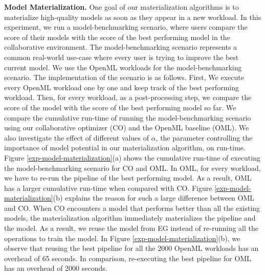 \textbf{Model Materialization. }
One goal of our materialization algorithms is to materialize high-quality models as soon as they appear in a new workload.
In this experiment, we run a model-benchmarking scenario, where users compare the score of their models with the score of the best performing model in the collaborative environment.
The model-benchmarking scenario represents a common real-world use-case where every user is trying to improve the best current model.
We use the OpenML workloads for the model-benchmarking scenario.
The implementation of the scenario is as follows.
First, We execute every OpenML workload one by one and keep track of the best performing workload.
Then, for every workload, as a post-processing step, we compare the score of the model with the score of the best performing model so far.
We compare the cumulative run-time of running the model-benchmarking scenario using our collaborative optimizer (CO) and the OpenML baseline (OML).
We also investigate the effect of different values of $\alpha$, the parameter controlling the importance of model potential in our materialization algorithm, on run-time.
Figure \ref{exp-model-materialization}(a) shows the cumulative run-time of executing the model-benchmarking scenario for CO and OML.
In OML, for every workload, we have to re-run the pipeline of the best performing model.
As a result, OML has a larger cumulative run-time when compared with CO.
Figure \ref{exp-model-materialization}(b) explains the reason for such a large difference between OML and CO.
When CO encounters a model that performs better than all the existing models, the materialization algorithm immediately materializes the pipeline and the model.
As a result, we reuse the model from EG instead of re-running all the operations to train the model.
In Figure \ref{exp-model-materialization}(b), we observe that reusing the best pipeline for all the 2000 OpenML workloads has an overhead of 65 seconds.
In comparison, re-executing the best pipeline for OML has an overhead of 2000 seconds.

